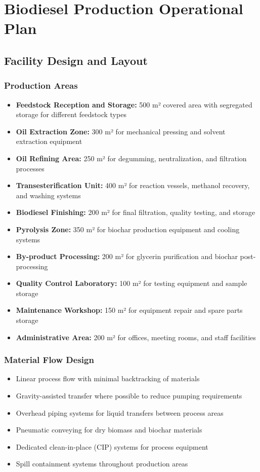 \section{Biodiesel Production Operational Plan}

\subsection{Facility Design and Layout}

\subsubsection{Production Areas}
\begin{itemize}
    \item \textbf{Feedstock Reception and Storage:} 500 m² covered area with segregated storage for different feedstock types
    \item \textbf{Oil Extraction Zone:} 300 m² for mechanical pressing and solvent extraction equipment
    \item \textbf{Oil Refining Area:} 250 m² for degumming, neutralization, and filtration processes
    \item \textbf{Transesterification Unit:} 400 m² for reaction vessels, methanol recovery, and washing systems
    \item \textbf{Biodiesel Finishing:} 200 m² for final filtration, quality testing, and storage
    \item \textbf{Pyrolysis Zone:} 350 m² for biochar production equipment and cooling systems
    \item \textbf{By-product Processing:} 200 m² for glycerin purification and biochar post-processing
    \item \textbf{Quality Control Laboratory:} 100 m² for testing equipment and sample storage
    \item \textbf{Maintenance Workshop:} 150 m² for equipment repair and spare parts storage
    \item \textbf{Administrative Area:} 200 m² for offices, meeting rooms, and staff facilities
\end{itemize}

\subsubsection{Material Flow Design}
\begin{itemize}
    \item Linear process flow with minimal backtracking of materials
    \item Gravity-assisted transfer where possible to reduce pumping requirements
    \item Overhead piping systems for liquid transfers between process areas
    \item Pneumatic conveying for dry biomass and biochar materials
    \item Dedicated clean-in-place (CIP) systems for process equipment
    \item Spill containment systems throughout production areas
\end{itemize}

